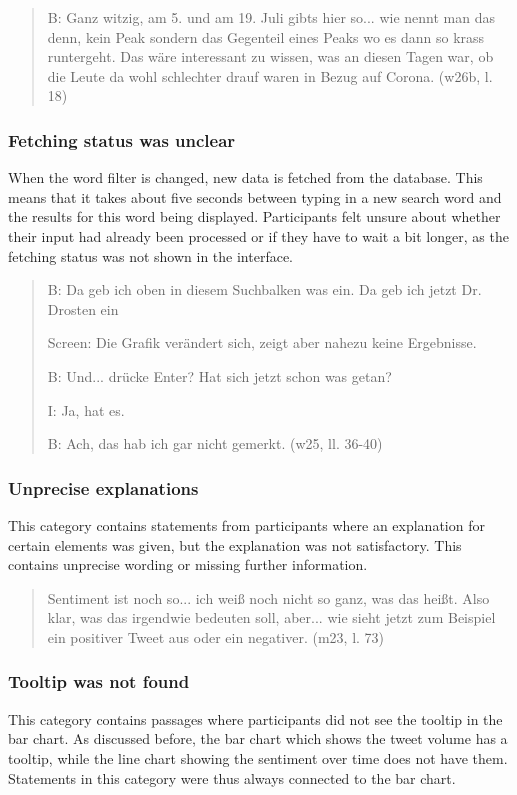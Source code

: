 \begin{quote}
    B: Ganz witzig, am 5. und am 19. Juli gibts hier so... wie nennt man das denn, kein Peak sondern das Gegenteil  eines Peaks wo es dann so krass runtergeht. Das wäre interessant zu wissen, was an diesen Tagen war, ob die Leute da wohl schlechter drauf waren in Bezug auf Corona.  (w26b, l. 18)
\end{quote}

\subsubsection*{Fetching status was unclear}
When the word filter is changed, new data is fetched from the database. This means that it takes about five seconds between typing in a new search word and the results for this word being displayed. Participants felt unsure about whether their input had already been processed or if they have to wait a bit longer, as the fetching status was not shown in the interface.

\begin{quote}
    B: Da geb ich oben in diesem Suchbalken was ein. Da geb ich jetzt Dr. Drosten ein

    Screen: Die Grafik verändert sich, zeigt aber nahezu keine Ergebnisse. 

    B: Und... drücke Enter? Hat sich jetzt schon was getan?

    I: Ja, hat es.

    B: Ach, das hab ich gar nicht gemerkt. (w25, ll. 36-40)
\end{quote}

\subsubsection*{Unprecise explanations}\label{sec:unprecise_explanations}
This category contains statements from participants where an explanation for certain elements was given, but the explanation was not satisfactory. This contains unprecise wording or missing further information.

\begin{quote}
    Sentiment ist noch so... ich weiß noch nicht so ganz, was das heißt. Also klar, was das irgendwie bedeuten soll, aber... wie sieht jetzt zum Beispiel ein positiver Tweet aus oder ein negativer. (m23, l. 73)
\end{quote}

\subsubsection*{Tooltip was not found}
This category contains passages where participants did not see the tooltip in the bar chart. As discussed before, the bar chart which shows the tweet volume has a tooltip, while the line chart showing the sentiment over time does not have them. Statements in this category were thus always connected to the bar chart.

